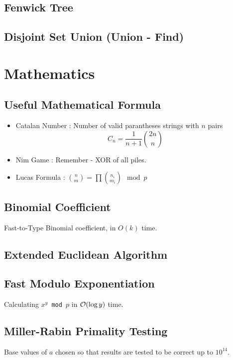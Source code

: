 \documentclass[landscape,8pt]{article}
\begin{document}
\begin{multicols}{2}
  \subsection{Fenwick Tree}
    
  \subsection{Disjoint Set Union (Union - Find)}
    
\columnbreak
\section{Mathematics}
  \subsection{Useful Mathematical Formula}
    \begin{itemize}
      \item Catalan Number : Number of valid parantheses strings with $n$ pairs
      \[
        C_n = \frac{1}{n+1}\binom{2n}{n}
      \]
      \item Nim Game : Remember - XOR of all piles.
      \item Lucas Formula : $\binom{n}{m} = \prod \binom{n_i}{m_i} \mod p$
    \end{itemize}

  \subsection{Binomial Coefficient}
    Fast-to-Type Binomial coefficient, in $O(k)$ time.
    

  \subsection{Extended Euclidean Algorithm}
    

  \subsection{Fast Modulo Exponentiation}
  Calculating \texttt{$x^y$ mod $p$} in $\order{\log y}$ time.
    

  \subsection{Miller-Rabin Primality Testing}
  Base values of $a$ chosen so that results are tested to be correct up to $10^{14}$.
    


\end{multicols}
\end{document}
